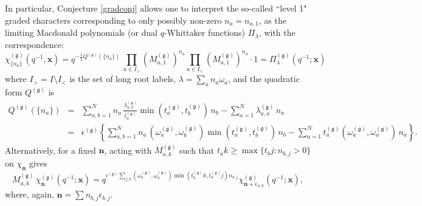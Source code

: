 \documentclass[12pt]{amsart}
\newcommand{\g}{{\mathfrak{g}}}
\newcommand{\bn}{{\mathbf n}}
\newcommand{\bx}{{\mathbf x}}
\numberwithin{equation}{section}
\numberwithin{table}{section}
\begin{document}
In particular, Conjecture \ref{gradconj} allows one to interpret the  so-called  ``level 1" graded characters 
corresponding to only possibly non-zero $n_a=n_{a,1}$, as the limiting Macdonald polynomials (or dual $q$-Whittaker functions)
$\Pi_\lambda$, with the correspondence:
\begin{equation}\label{dema} \chi_{\{n_a\}}^{(\g)}(q^{-1},\bx)=q^{-\frac{1}{2}Q^{(\g)}(\{n_a\})}\, \prod_{a\in I_>} \left(M_{a,1}^{(\g)}\right)^{n_a}\prod_{a\in I_<} \left(M_{a,1}^{(\g)}\right)^{n_a}  \cdot 1 =\Pi_\lambda^{(\g)}(q^{-1};\bx)
\end{equation}
where $I_>=I\setminus I_<$ is the set of long root labels, $\lambda=\sum_a n_a\omega_a$, and
the quadratic form $Q^{(\g)}$ is
\begin{eqnarray*}
Q^{(\g)}(\{n_a\}) &=&\sum_{a,b=1}^N n_{a}\,\frac{\lambda_{a,b}^{(\g)}}{t_a^{(\g)}} \min(t_a^{(\g)},t_b^{(\g)})\,n_{b} -\sum_{a=1}^N  \lambda_{a,a}^{(\g)}\, n_{a} \\
&=&\epsilon^{(\g)}\left\{ \sum_{a,b=1}^N n_{a}\,(\omega_a^{(\g)},\omega_b^{(\g)}) \min(t_a^{(\g)},t_b^{(\g)})\,n_{b} -\sum_{a=1}^N t_a^{(\g)} (\omega_a^{(\g)},\omega_a^{(\g)})\, n_{a}  \right\}  .
\end{eqnarray*}
Alternatively, for a fixed $\bn$, acting with $M_{a,k}^{(\g)}$ such that $t_a k \geq \max\{t_b j: n_{b,j}>0\}$ on $\chi_\bn$ gives
$$
M_{a,k}^{(\g)}\,\chi_\bn^{(\g)}(q^{-1};\bx) = q^{\epsilon^{(\g)} \sum_{j,b} (\omega_a^{(\g)},\omega_b^{(\g)}) \min(t^{(\g)}_b k,t^{(\g)}_a j)n_{b,j}} \chi_{\bn+\epsilon_{a,k}}^{(\g)}(q^{-1};\bx),
$$
where, again, $\bn=\sum n_{b,j} \epsilon_{b,j}$.
\end{document}
